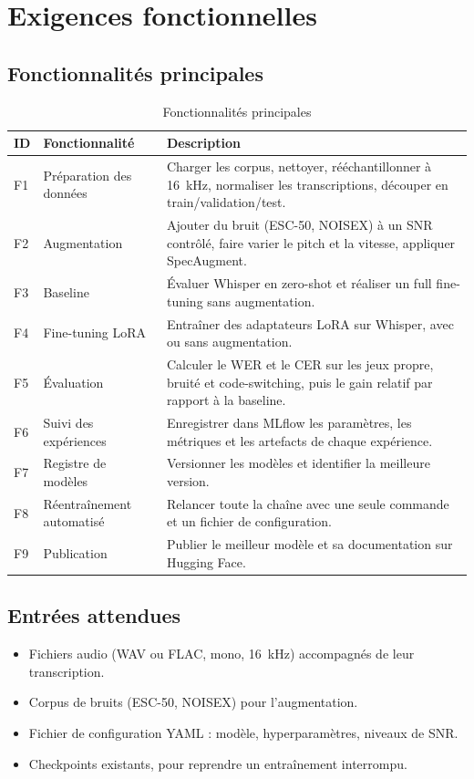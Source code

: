 \documentclass[12pt,a4paper]{report}
\begin{document}
\chapter{Exigences fonctionnelles}

\section{Fonctionnalités principales}
\begin{table}[h]
  \centering
  \small
  \begin{tabularx}{\textwidth}{lp{3.6cm}X}
    \toprule
    \textbf{ID} & \textbf{Fonctionnalité} & \textbf{Description} \\
    \midrule
    F1 & Préparation des données & Charger les corpus, nettoyer, rééchantillonner à
    16~kHz, normaliser les transcriptions, découper en train/validation/test. \\
    F2 & Augmentation & Ajouter du bruit (ESC-50, NOISEX) à un SNR contrôlé, faire
    varier le pitch et la vitesse, appliquer SpecAugment. \\
    F3 & Baseline & Évaluer Whisper en zero-shot et réaliser un full fine-tuning
    sans augmentation. \\
    F4 & Fine-tuning LoRA & Entraîner des adaptateurs LoRA sur Whisper, avec ou
    sans augmentation. \\
    F5 & Évaluation & Calculer le WER et le CER sur les jeux propre, bruité et
    code-switching, puis le gain relatif par rapport à la baseline. \\
    F6 & Suivi des expériences & Enregistrer dans MLflow les paramètres, les
    métriques et les artefacts de chaque expérience. \\
    F7 & Registre de modèles & Versionner les modèles et identifier la meilleure
    version. \\
    F8 & Réentraînement automatisé & Relancer toute la chaîne avec une seule
    commande et un fichier de configuration. \\
    F9 & Publication & Publier le meilleur modèle et sa documentation sur
    Hugging Face. \\
    \bottomrule
  \end{tabularx}
  \caption{Fonctionnalités principales}
  \label{tab:fonctionnalites}
\end{table}

\section{Entrées attendues}
\begin{itemize}
  \item Fichiers audio (WAV ou FLAC, mono, 16~kHz) accompagnés de leur transcription.
  \item Corpus de bruits (ESC-50, NOISEX) pour l'augmentation.
  \item Fichier de configuration YAML : modèle, hyperparamètres, niveaux de SNR.
  \item Checkpoints existants, pour reprendre un entraînement interrompu.
\end{itemize}
\end{document}
